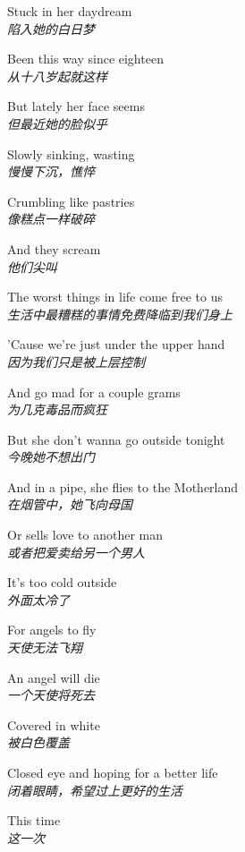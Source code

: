 \begin{spacing}{1.5}
\begin{flushleft}
Stuck in her daydream\\
\textit{陷入她的白日梦}\lyricspace

Been this way since eighteen\\
\textit{从十八岁起就这样}\lyricspace

But lately her face seems\\
\textit{但最近她的脸似乎}\lyricspace

Slowly sinking, wasting\\
\textit{慢慢下沉，憔悴}\lyricspace

Crumbling like pastries\\
\textit{像糕点一样破碎}\lyricspace

And they scream\\
\textit{他们尖叫}\lyricspace

The worst things in life come free to us\\
\textit{生活中最糟糕的事情免费降临到我们身上}\lyricspace

'Cause we're just under the upper hand\\
\textit{因为我们只是被上层控制}\lyricspace

And go mad for a couple grams\\
\textit{为几克毒品而疯狂}\lyricspace

But she don't wanna go outside tonight\\
\textit{今晚她不想出门}\lyricspace

And in a pipe, she flies to the Motherland\\
\textit{在烟管中，她飞向母国}\lyricspace

Or sells love to another man\\
\textit{或者把爱卖给另一个男人}\lyricspace

It's too cold outside\\
\textit{外面太冷了}\lyricspace

For angels to fly\\
\textit{天使无法飞翔}\lyricspace

An angel will die\\
\textit{一个天使将死去}\lyricspace

Covered in white\\
\textit{被白色覆盖}\lyricspace

Closed eye and hoping for a better life\\
\textit{闭着眼睛，希望过上更好的生活}\lyricspace

This time\\
\textit{这一次}\lyricspace


\end{flushleft}
\end{spacing}

